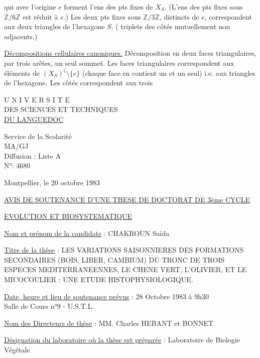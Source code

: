 
qui avec l'origine $e$ forment l'ens des pts fixes de $X_S$. (L'ens des pts fixes sous $\mathbb Z/6\mathbb Z$ est réduit à $e$.) Les deux pts fixes sous $\mathbb Z/3\mathbb Z$, distincts de $e$, correspondent aux deux triangles  de l'hexagone $S$. ( triplets des côtés mutuellement non adjacents.)

\uline{Décompositions cellulaires canoniques.} Décomposition en deux faces triangulaires, par trois arêtes, un seul sommet. Les faces triangulaires correspondent aux éléments de $(X_S)^\zeta\setminus\{e\}$ (chaque face en contient un et un seul) i.e. aux triangles  de l'hexagone. Les côtés correspondent aux trois


\begin{center}
U N I V E R S I T E\\
DES SCIENCES ET TECHNIQUES\\
\uline{DU LANGUEDOC}

Service de la Scolarité\\
MA/GJ\\
Diffusion : Liste A\\
N°: 4680
\end{center}

Montpellier, le 20 octobre 1983

\begin{center}
\uline{AVIS DE SOUTENANCE D'UNE THESE DE DOCTORAT DE 3ème CYCLE}

\uline{EVOLUTION ET BIOSYSTEMATIQUE}
\end{center}

\uline{Nom et prénom de la candidate} : CHAKROUN Saïda

\uline{Titre de la thèse} : LES VARIATIONS SAISONNIERES DES FORMATIONS SECONDAIRES (BOIS, LIBER, CAMBIUM) DU TRONC DE TROIS ESPECES MEDITERRANEENNES, LE CHENE VERT, L'OLIVIER, ET LE MICOCOULIER : UNE ETUDE HISTOPHYSIOLOGIQUE.

\uline{Date, heure et lieu de soutenance prévus} : 28 Octobre 1983 à 9h30\\
Salle de Cours n°9 - U.S.T.L.

\uline{Nom des Directeurs de thèse} : MM. Charles HEBANT et BONNET

\uline{Désignation du laboratoire où la thèse est préparée} : Laboratoire de Biologie Végétale

